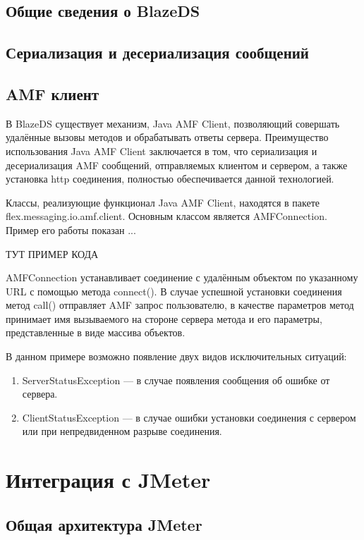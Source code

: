 \subsection{Общие сведения о BlazeDS}

\subsection{Сериализация и десериализация сообщений}

\subsection{AMF клиент}

В BlazeDS существует механизм, Java AMF Client, позволяющий совершать удалённые вызовы методов и обрабатывать ответы
сервера. Преимущество использования Java AMF Client заключается в том, что сериализация и десериализация AMF сообщений,
отправляемых клиентом и сервером, а также установка http соединения, полностью обеспечивается данной технологией.

Классы, реализующие функционал Java AMF Client, находятся в пакете flex.messaging.io.amf.client. Основным классом
является AMFConnection. Пример его работы показан ...

 ТУТ ПРИМЕР КОДА

AMFConnection устанавливает соединение с удалённым объектом по указанному URL с помощью метода connect().
В случае успешной установки соединения метод call() отправляет AMF запрос пользователю, в качестве параметров метод
принимает имя вызываемого на стороне сервера метода и его параметры, представленные в виде массива объектов.

В данном примере возможно появление двух видов исключительных ситуаций:

\begin{enumerate}
\item ServerStatusException --- в случае появления сообщения об ошибке от сервера.
\item ClientStatusException --- в случае ошибки установки соединения с сервером или при непредвиденном разрыве
соединения.
\end{enumerate}

\section{Интеграция с JMeter}

\subsection{Общая архитектура JMeter}

